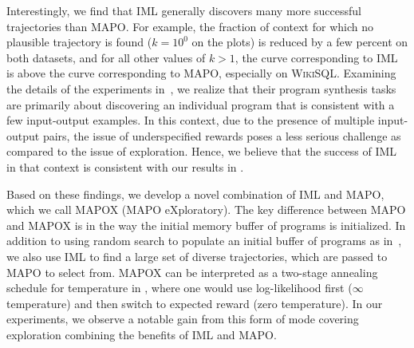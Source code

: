 Interestingly, we find that IML generally discovers many more
successful trajectories than MAPO. For example, the fraction of
context for which no plausible trajectory is found ($k=10^0$ on the
plots) is reduced by a few percent on both datasets, and for all other
values of $k > 1$, the curve corresponding to IML is above the curve
corresponding to MAPO, especially on \textsc{WikiSQL}. Examining the details of
the experiments in~\citet{pqt2018}, we realize that their program
synthesis tasks are primarily about discovering an individual program
that is consistent with a few input-output examples. In this context,
due to the presence of multiple input-output pairs, the issue of
underspecified rewards poses a less serious challenge as compared to the
issue of exploration. Hence, we believe that the success of IML in that context is
consistent with our results in .

Based on these findings, we develop a novel combination of IML and
MAPO, which we call MAPOX (MAPO eXploratory). The key difference
between MAPO and MAPOX is in the way the initial memory buffer of
programs is initialized. In addition to using random search to
populate an initial buffer of programs as in~\cite{NIPS2018_8204},
we also use IML to find a large set of diverse trajectories, which are
passed to MAPO to select from. MAPOX can be interpreted as a two-stage
annealing schedule for temperature in \citet{nachum2016improving}, where one 
would use log-likelihood first ($\infty$ temperature) and then switch to expected
reward (zero temperature). In our experiments, we observe a notable gain from
this form of mode covering exploration combining the benefits of IML and MAPO.\\
